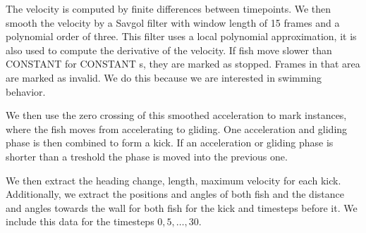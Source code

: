 \documentclass[nobib]{tufte-handout}
\begin{document}
The velocity is computed by finite differences between timepoints.
We then smooth the velocity by a Savgol filter with window length of 15 frames and a polynomial order of three.
This filter uses a local polynomial approximation, it is also used to compute the derivative of the velocity.
If fish move slower than CONSTANT for CONSTANT s, they are marked as stopped.
Frames in that area are marked as invalid.
We do this because we are interested in swimming behavior.

We then use the zero crossing of this smoothed acceleration to mark instances, where the fish moves from accelerating to gliding.
One acceleration and gliding phase is then combined to form a kick.
If an acceleration or gliding phase is shorter than a treshold the phase is moved into the previous one.


We then extract the heading change, length, maximum velocity for each kick.
Additionally, we extract the positions and angles of both fish and the distance and angles towards the wall for both fish for the kick and timesteps before it.
We include this data for the timesteps \(0, 5, \ldots, 30 \).
\end{document}

